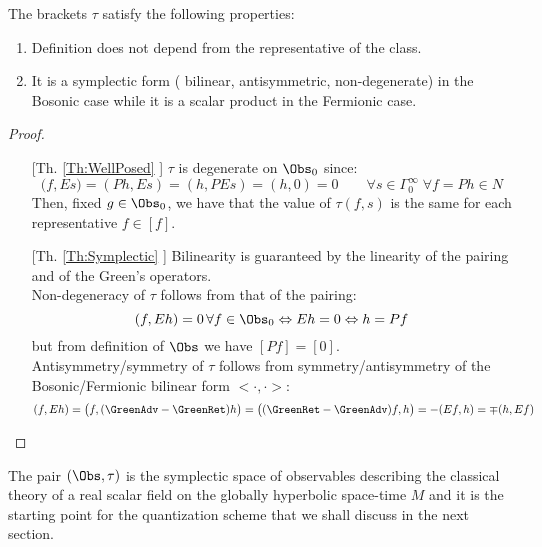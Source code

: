\documentclass[Main]{subfiles}
\begin{document}
				\begin{proposition}
				The brackets  $\tau$ satisfy the following properties:
					\begin{enumerate}
						\item\label{Th:WellPosed} %
							Definition does not depend from the representative of the class.
						\item\label{Th:Symplectic} It is a symplectic form ( bilinear, antisymmetric, non-degenerate) in the Bosonic case while it is a scalar product in	the Fermionic case.
					\end{enumerate}
				\end{proposition}
				\begin{proof}
					\begin{itemize}
						\item [[Th. \ref{Th:WellPosed}]]
							 $\tau$ is degenerate on $\Obs_0$ since:
							 \begin{displaymath}
							 	\big( f , E s \big) = (P h , E s) = (h, PE s) = (h,0) = 0 \qquad \forall s \in \Gamma_0^\infty \; \forall f=Ph \in N
							 \end{displaymath}
							 Then, fixed $g\in \Obs_0$, we have that the value of $\tau(f,s)$ is the same for each representative $f\in[f]$.

						\item [[Th. \ref{Th:Symplectic}]]	
							Bilinearity is guaranteed by the linearity of the pairing and of the Green's operators.\\
							Non-degeneracy of $\tau$ follows from that of the pairing:
							\begin{displaymath}
								(f, E h) = 0 \, \forall f \in \Obs_0 \Leftrightarrow E h = 0 \Leftrightarrow h = P f
							\end{displaymath}
							but from definition of $\Obs$ we have $[Pf] = [0]$.\\
							Antisymmetry/symmetry of $\tau $ follows from symmetry/antisymmetry of the Bosonic/Fermionic bilinear form $< \cdot, \cdot>$:
							\begin{displaymath}
								( f , E h ) =\big(f, (\GreenAdv - \GreenRet ) h \big)= \big( ( \GreenRet - \GreenAdv) f , h \big) =- ( Ef , h) = \mp(h, Ef)
							\end{displaymath}							 
					\end{itemize}
				\end{proof}
				The pair $(\Obs,\tau)$ is the symplectic space of observables describing the classical theory of a real scalar field on the globally hyperbolic space-time $M$ and it is the starting point for the quantization scheme that we shall discuss in the next section.
\end{document}
